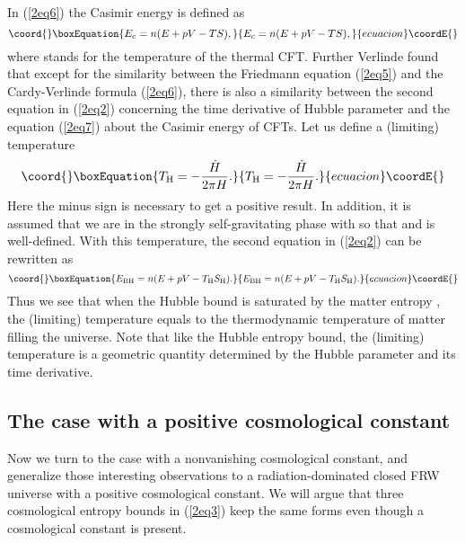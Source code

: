 \documentclass[a4paper,12pt]{article}
\begin{document}
In (\ref{2eq6}) the Casimir energy \coordHE{} is defined as~\cite{Verl}
\begin{equation}\coord{}\boxEquation{
\label{2eq7}
 E_c=n(E +pV -TS),
 }{
E_c=n(E +pV -TS),
 }{ecuacion}\coordE{}\end{equation}
 where \coordHE{} stands for the temperature of the thermal CFT. Further
 Verlinde found that except for the similarity between the
 Friedmann equation (\ref{2eq5}) and the Cardy-Verlinde formula
 (\ref{2eq6}), there is also a similarity between the second
 equation in (\ref{2eq2}) concerning the time derivative of Hubble
 parameter and the equation (\ref{2eq7}) about the Casimir energy
 of CFTs. Let us define a (limiting) temperature
 \begin{equation}\coord{}\boxEquation{
 \label{2eq8}
 T_{\rm H}=-\frac{\dot H}{2\pi H}.
 }{
 T_{\rm H}=-\frac{\dot H}{2\pi H}.
 }{ecuacion}\coordE{}\end{equation}
 Here the minus sign is necessary to get a positive result. In
 addition, it is assumed that we are in the strongly
 self-gravitating phase with \coordHE{} so that \coordHE{} and 
 \coordHE{} is well-defined.  With this temperature, the second
 equation in (\ref{2eq2}) can be rewritten as
 \begin{equation}\coord{}\boxEquation{
 \label{2eq9}
 E_{\rm BH}=n(E+pV -T_{\rm H}S_{\rm H}).
 }{
 E_{\rm BH}=n(E+pV -T_{\rm H}S_{\rm H}).
 }{ecuacion}\coordE{}\end{equation}
 Thus we see that when the Hubble bound \coordHE{} is saturated by the
 matter entropy \coordHE{}, the (limiting) temperature \coordHE{} equals
 to the thermodynamic temperature \coordHE{} of matter filling the
 universe. Note that like the Hubble entropy bound,  the (limiting) temperature
 \coordHE{} is a geometric quantity determined by the Hubble parameter 
and its time derivative.


\subsection{The case with a positive cosmological constant}


Now we turn to the case with a nonvanishing cosmological constant,
and generalize those interesting observations to a
radiation-dominated closed FRW universe with a positive
cosmological constant. We will argue that three cosmological entropy
bounds in (\ref{2eq3}) keep the same forms even though a cosmological 
constant is present.
\end{document}
